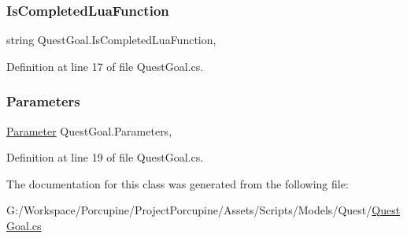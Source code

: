 \subsubsection{\texorpdfstring{Is\+Completed\+Lua\+Function}{IsCompletedLuaFunction}}
{\footnotesize\ttfamily string Quest\+Goal.\+Is\+Completed\+Lua\+Function\hspace{0.3cm}{\ttfamily [get]}, {\ttfamily [set]}}



Definition at line 17 of file Quest\+Goal.\+cs.

\mbox{\label{class_quest_goal_a0bc1dfd1a0a0e0c5d79abc984f9bcbc3}} 
\subsubsection{\texorpdfstring{Parameters}{Parameters}}
{\footnotesize\ttfamily \hyperlink{class_parameter}{Parameter} Quest\+Goal.\+Parameters\hspace{0.3cm}{\ttfamily [get]}, {\ttfamily [set]}}



Definition at line 19 of file Quest\+Goal.\+cs.



The documentation for this class was generated from the following file\+:\begin{DoxyCompactItemize}
\item 
G\+:/\+Workspace/\+Porcupine/\+Project\+Porcupine/\+Assets/\+Scripts/\+Models/\+Quest/\hyperlink{_quest_goal_8cs}{Quest\+Goal.\+cs}\end{DoxyCompactItemize}
